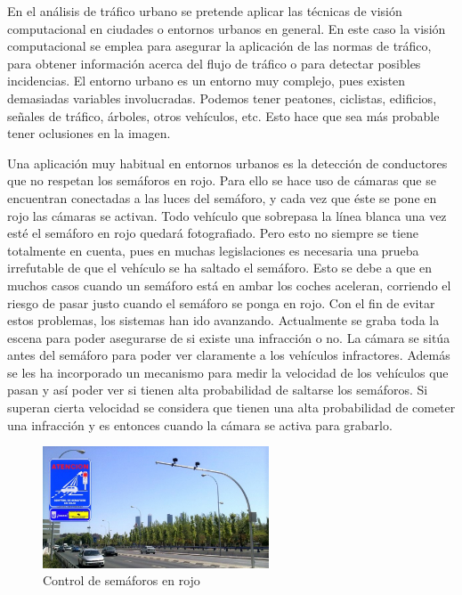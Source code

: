 En el análisis de tráfico urbano se pretende aplicar las técnicas de visión computacional en ciudades o entornos urbanos en general. En este caso la visión computacional se emplea para asegurar la aplicación de las normas de tráfico, para obtener información acerca del flujo de tráfico o para detectar posibles incidencias. El entorno urbano es un entorno muy complejo, pues existen demasiadas variables involucradas. Podemos tener peatones, ciclistas, edificios, señales de tráfico, árboles, otros vehículos, etc. Esto hace que sea más probable tener oclusiones en la imagen.

Una aplicación muy habitual en entornos urbanos es la detección de conductores que no respetan los semáforos en rojo. Para ello se hace uso de cámaras que se encuentran conectadas a las luces del semáforo, y cada vez que éste se pone en rojo las cámaras se activan. Todo vehículo que sobrepasa la línea blanca una vez esté el semáforo en rojo quedará fotografiado. Pero esto no siempre se tiene totalmente en cuenta, pues en muchas legislaciones es necesaria una prueba irrefutable de que el vehículo se ha saltado el semáforo. Esto se debe a que en muchos casos cuando un semáforo está en ambar los coches aceleran, corriendo el riesgo de pasar justo cuando el semáforo se ponga en rojo. Con el fin de evitar estos problemas, los sistemas han ido avanzando. Actualmente se graba toda la escena para poder asegurarse de si existe una infracción o no. La cámara se sitúa antes del semáforo para poder ver claramente a los vehículos infractores. Además se les ha incorporado un mecanismo para medir la velocidad de los vehículos que pasan y así poder ver si tienen alta probabilidad de saltarse los semáforos. Si superan cierta velocidad se considera que tienen una alta probabilidad de cometer una infracción y es entonces cuando la cámara se activa para grabarlo.
\begin{figure}[H]
  \begin{center}
    \includegraphics[width=0.6\textwidth]{figures/Introduccion/control_semaforo.jpg}
		\caption{Control de semáforos en rojo}
		\label{fig.control_semaforos}
		\end{center}
\end{figure}
